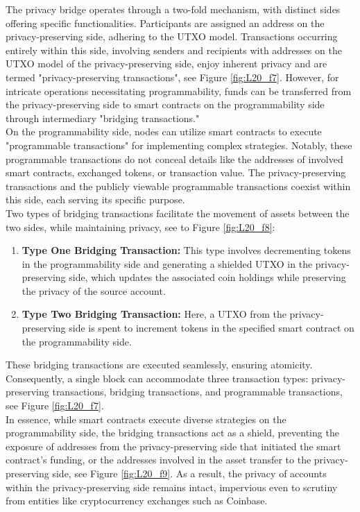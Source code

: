 The privacy bridge operates through a two-fold mechanism, with distinct sides offering specific functionalities. Participants are assigned an address on the privacy-preserving side, adhering to the UTXO model. Transactions occurring entirely within this side, involving senders and recipients with addresses on the UTXO model of the privacy-preserving side, enjoy inherent privacy and are termed "privacy-preserving transactions", see Figure \ref{fig:L20_f7}. However, for intricate operations necessitating programmability, funds can be transferred from the privacy-preserving side to smart contracts on the programmability side through intermediary "bridging transactions."\\
On the programmability side, nodes can utilize smart contracts to execute "programmable transactions" for implementing complex strategies. Notably, these programmable transactions do not conceal details like the addresses of involved smart contracts, exchanged tokens, or transaction value. The privacy-preserving transactions and the publicly viewable programmable transactions coexist within this side, each serving its specific purpose.\\
Two types of bridging transactions facilitate the movement of assets between the two sides, while maintaining privacy, see to Figure \ref{fig:L20_f8}:
\begin{enumerate}
	\item \textbf{Type One Bridging Transaction:} This type involves decrementing tokens in the programmability side and generating a shielded UTXO in the privacy-preserving side, which updates the associated coin holdings while preserving the privacy of the source account.
	\item \textbf{Type Two Bridging Transaction:} Here, a UTXO from the privacy-preserving side is spent to increment tokens in the specified smart contract on the programmability side.
\end{enumerate}
These bridging transactions are executed seamlessly, ensuring atomicity. Consequently, a single block can accommodate three transaction types: privacy-preserving transactions, bridging transactions, and programmable transactions, see Figure \ref{fig:L20_f7}.\\
In essence, while smart contracts execute diverse strategies on the programmability side, the bridging transactions act as a shield, preventing the exposure of addresses from the privacy-preserving side that initiated the smart contract's funding, or the addresses involved in the asset transfer to the privacy-preserving side, see Figure \ref{fig:L20_f9}. As a result, the privacy of accounts within the privacy-preserving side remains intact, impervious even to scrutiny from entities like cryptocurrency exchanges such as Coinbase.
